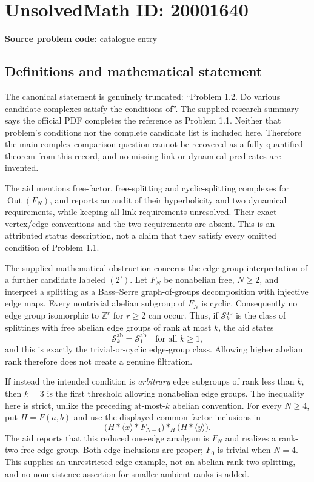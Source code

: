 \documentclass[11pt]{article}
\newcommand{\Z}{\mathbb{Z}}
\begin{document}
\section*{UnsolvedMath ID: 20001640}
\textbf{Source problem code:} catalogue entry
\subsection{Definitions and mathematical statement}
The canonical statement is genuinely truncated: ``Problem 1.2. Do various candidate complexes satisfy the conditions of''. The supplied research summary says the official PDF completes the reference as Problem 1.1. Neither that problem's conditions nor the complete candidate list is included here. Therefore the main complex-comparison question cannot be recovered as a fully quantified theorem from this record, and no missing link or dynamical predicates are invented.

The aid mentions free-factor, free-splitting and cyclic-splitting complexes for $\operatorname{Out}(F_N)$, and reports an audit of their hyperbolicity and two dynamical requirements, while keeping all-link requirements unresolved. Their exact vertex/edge conventions and the two requirements are absent. This is an attributed status description, not a claim that they satisfy every omitted condition of Problem 1.1.

The supplied mathematical obstruction concerns the edge-group interpretation of a further candidate labeled $(2')$. Let $F_N$ be nonabelian free, $N\geq2$, and interpret a splitting as a Bass--Serre graph-of-groups decomposition with injective edge maps. Every nontrivial abelian subgroup of $F_N$ is cyclic. Consequently no edge group isomorphic to $\Z^r$ for $r\geq2$ can occur. Thus, if $\mathscr S_k^{\mathrm{ab}}$ is the class of splittings with free abelian edge groups of rank at most $k$, the aid states
\[
 \mathscr S_k^{\mathrm{ab}}=\mathscr S_1^{\mathrm{ab}}
 \quad\text{for all }k\geq1,
\]
and this is exactly the trivial-or-cyclic edge-group class. Allowing higher abelian rank therefore does not create a genuine filtration.

If instead the intended condition is \emph{arbitrary} edge subgroups of rank less than $k$, then $k=3$ is the first threshold allowing nonabelian edge groups. The inequality here is strict, unlike the preceding at-most-$k$ abelian convention. For every $N\geq4$, put $H=F(a,b)$ and use the displayed common-factor inclusions in
\[
 \bigl(H*\langle x\rangle*F_{N-4}\bigr)*_{H}
       \bigl(H*\langle y\rangle\bigr).
\]
The aid reports that this reduced one-edge amalgam is $F_N$ and realizes a rank-two free edge group. Both edge inclusions are proper; $F_0$ is trivial when $N=4$. This supplies an unrestricted-edge example, not an abelian rank-two splitting, and no nonexistence assertion for smaller ambient ranks is added.
\end{document}

